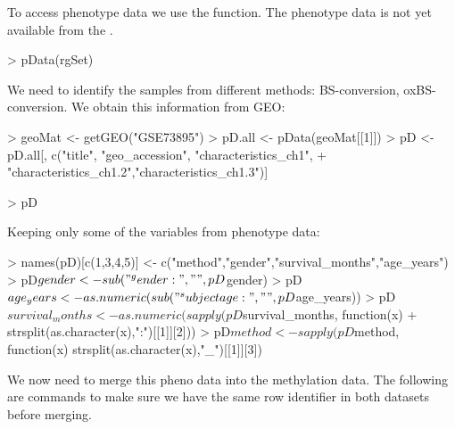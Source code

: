 \documentclass{article}
\begin{document}
To access phenotype data we use the  function. The phenotype data is not yet available from the .
\begin{Schunk}
\begin{Sinput}
> pData(rgSet)
\end{Sinput}
\end{Schunk}

We need to identify the samples from different methods: BS-conversion, oxBS-conversion. We obtain this information from GEO:

\begin{Schunk}
\begin{Sinput}
> geoMat <- getGEO("GSE73895")
> pD.all <- pData(geoMat[[1]])
> pD <- pD.all[, c("title", "geo_accession", "characteristics_ch1",
+                  "characteristics_ch1.2","characteristics_ch1.3")]
\end{Sinput}
\end{Schunk}



\begin{Schunk}
\begin{Sinput}
> pD
\end{Sinput}
\end{Schunk}

Keeping only some of the variables from phenotype data:
\begin{Schunk}
\begin{Sinput}
> names(pD)[c(1,3,4,5)] <- c("method","gender","survival_months","age_years")
> pD$gender <- sub("^gender: ", "", pD$gender)
> pD$age_years <- as.numeric(sub("^subject age: ", "", pD$age_years))
> pD$survival_months <- as.numeric(sapply(pD$survival_months, function(x)
+   strsplit(as.character(x),":")[[1]][2]))
> pD$method <- sapply(pD$method, function(x) strsplit(as.character(x),"_")[[1]][3])
\end{Sinput}
\end{Schunk}

We now need to merge this pheno data into the methylation data. The following are commands to make sure we have the same row identifier in both datasets before merging.

\begin{Schunk}
\end{Schunk}
\end{document}
